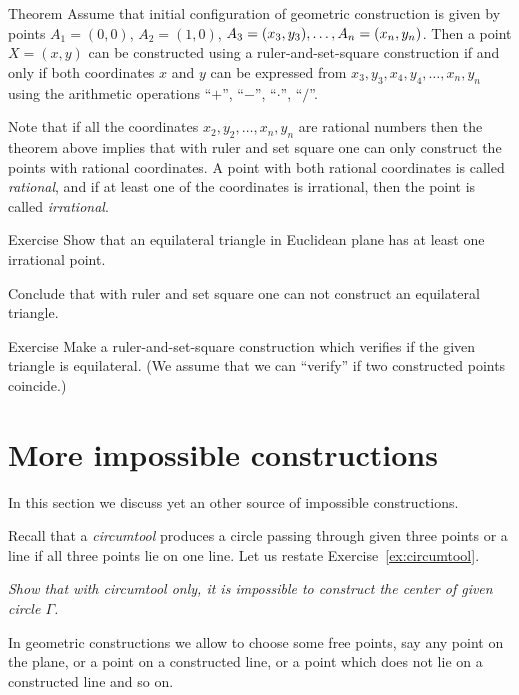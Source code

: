 \begin{thm}{Theorem}
Assume that initial configuration of geometric construction is given by points $A_1=(0,0)$, $A_2=(1,0)$, $A_3=(x_3,y_3),\z\dots,A_n=(x_n,y_n)$.
Then a point $X=(x,y)$ can be constructed using a ruler-and-set-square construction
if and only if both coordinates $x$ and $y$ can be expressed from $x_3,y_3,x_4,y_4,\dots,x_n,y_n$ using the arithmetic operations ``$+$'', ``$-$'', ``$\cdot$'', ``$/$''. 
\end{thm}

Note that if all the coordinates $x_2,y_2,\dots,x_n,y_n$ are rational numbers then the theorem above implies that with ruler and set square one can only construct the points with rational coordinates.
A point with both rational coordinates is called \emph{rational},
and if at least one of the coordinates is irrational, then the point is called \emph{irrational}.

\begin{thm}{Exercise}\label{ex:equilateral triangle}
Show that an equilateral triangle in Euclidean plane has at least one irrational point.

Conclude that with ruler and set square one can not construct an equilateral triangle.
\end{thm}


\begin{thm}{Exercise}\label{ex:equilateral triangle-verify}
Make a ruler-and-set-square construction which verifies if the given triangle is  equilateral.
(We assume that we can ``verify'' if two constructed points coincide.) 
\end{thm}


\section*{More impossible constructions}

In this section we discuss yet an other source of impossible constructions. 

Recall that a \emph{circumtool} produces a circle passing through given three points
or a line if all three points lie on one line.
Let us restate Exercise~\ref{ex:circumtool}.

\textit{Show that with circumtool only,
it is impossible to construct the center of given circle $\Gamma$.}
\medskip

In geometric constructions we allow to choose some free points,
say any point on the plane, or a point on a constructed line, or a point which does not lie on a constructed line and so on.

